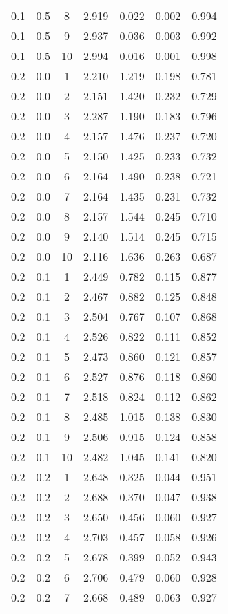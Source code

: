 \begin{tabular}{|c|c|c|c|c|c|c|}
0.1 & 0.5 & 8 & 2.919 & 0.022 & 0.002 & 0.994 \\
0.1 & 0.5 & 9 & 2.937 & 0.036 & 0.003 & 0.992 \\
0.1 & 0.5 & 10 & 2.994 & 0.016 & 0.001 & 0.998 \\
0.2 & 0.0 & 1 & 2.210 & 1.219 & 0.198 & 0.781 \\
0.2 & 0.0 & 2 & 2.151 & 1.420 & 0.232 & 0.729 \\
0.2 & 0.0 & 3 & 2.287 & 1.190 & 0.183 & 0.796 \\
0.2 & 0.0 & 4 & 2.157 & 1.476 & 0.237 & 0.720 \\
0.2 & 0.0 & 5 & 2.150 & 1.425 & 0.233 & 0.732 \\
0.2 & 0.0 & 6 & 2.164 & 1.490 & 0.238 & 0.721 \\
0.2 & 0.0 & 7 & 2.164 & 1.435 & 0.231 & 0.732 \\
0.2 & 0.0 & 8 & 2.157 & 1.544 & 0.245 & 0.710 \\
0.2 & 0.0 & 9 & 2.140 & 1.514 & 0.245 & 0.715 \\
0.2 & 0.0 & 10 & 2.116 & 1.636 & 0.263 & 0.687 \\
0.2 & 0.1 & 1 & 2.449 & 0.782 & 0.115 & 0.877 \\
0.2 & 0.1 & 2 & 2.467 & 0.882 & 0.125 & 0.848 \\
0.2 & 0.1 & 3 & 2.504 & 0.767 & 0.107 & 0.868 \\
0.2 & 0.1 & 4 & 2.526 & 0.822 & 0.111 & 0.852 \\
0.2 & 0.1 & 5 & 2.473 & 0.860 & 0.121 & 0.857 \\
0.2 & 0.1 & 6 & 2.527 & 0.876 & 0.118 & 0.860 \\
0.2 & 0.1 & 7 & 2.518 & 0.824 & 0.112 & 0.862 \\
0.2 & 0.1 & 8 & 2.485 & 1.015 & 0.138 & 0.830 \\
0.2 & 0.1 & 9 & 2.506 & 0.915 & 0.124 & 0.858 \\
0.2 & 0.1 & 10 & 2.482 & 1.045 & 0.141 & 0.820 \\
0.2 & 0.2 & 1 & 2.648 & 0.325 & 0.044 & 0.951 \\
0.2 & 0.2 & 2 & 2.688 & 0.370 & 0.047 & 0.938 \\
0.2 & 0.2 & 3 & 2.650 & 0.456 & 0.060 & 0.927 \\
0.2 & 0.2 & 4 & 2.703 & 0.457 & 0.058 & 0.926 \\
0.2 & 0.2 & 5 & 2.678 & 0.399 & 0.052 & 0.943 \\
0.2 & 0.2 & 6 & 2.706 & 0.479 & 0.060 & 0.928 \\
0.2 & 0.2 & 7 & 2.668 & 0.489 & 0.063 & 0.927 \\

\end{tabular}
